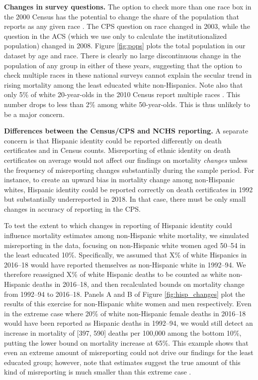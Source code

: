 \vspace{6mm} \textbf{Changes in survey questions.} The option to check
more than one race box in the 2000 Census has the potential to change
the share of the population that reports as any given race
\citep{Currie2018}. The CPS question on race changed in 2003, while
the question in the ACS (which we use only to calculate the
institutionalized population) changed in 2008.  Figure \ref{fig:pops}
plots the total population in our dataset by age and race. There is
clearly no large discontinuous change in the population of any group
in either of these years, suggesting that the option to check multiple
races in these national surveys cannot explain the secular trend in
rising mortality among the least educated white non-Hispanics. Note
also that only 5\% of white 20-year-olds in the 2010 Census report
multiple races \citep{Currie2018}. This number drops to less than 2\%
among white 50-year-olds. This is thus unlikely to be a major concern.

\vspace{6mm}

\textbf{Differences between the Census/CPS and NCHS reporting.} A
separate concern is that Hispanic identity could be reported
differently on death certificates and in Census counts. Misreporting
of ethnic identity on death certificates on average would not affect
our findings on mortality \textit{changes} unless the frequency of
misreporting changes substantially during the sample
period. For instance, to create an upward bias in mortality change
among non-Hispanic whites, Hispanic identity could be reported
correctly on death certificates in 1992 but substantially underreported
in 2018. In that case, there must be only small changes in accuracy of
reporting in the CPS. 

To test the extent to which changes in reporting of Hispanic identity could influence mortality estimates among non-Hispanic white mortality, we simulated misreporting in the data, focusing on non-Hispanic white women aged 50--54 in the least educated 10\%. Specifically, we assumed that X\% of white Hispanics in 2016--18 would have reported themselves as non-Hispanic white in 1992--94. We therefore reassigned X\% of white Hispanic deaths to be counted as white non-Hispanic deaths in 2016--18, and then recalculated bounds on mortality change from 1992--94 to 2016--18.  Panels A and B of Figure \ref{fig:hisp_changes} plot the results of this exercise for non-Hispanic white women and men respectively. Even in the extreme case where 20\% of white non-Hispanic female deaths in 2016--18 would have been reported as Hispanic deaths in 1992--94, we would still detect an increase in mortality of [397, 590] deaths per 100,000 among the bottom 10\%, putting the lower bound on mortality increase at 65\%. This example shows that even an extreme amount of misreporting could not drive our findings for the least educated group; however, note that estimates suggest the true amount of this kind of misreporting is much smaller than this extreme case \citep{Rosenberg1999,Arias2008,Arias2010,Ruiz2013}.

